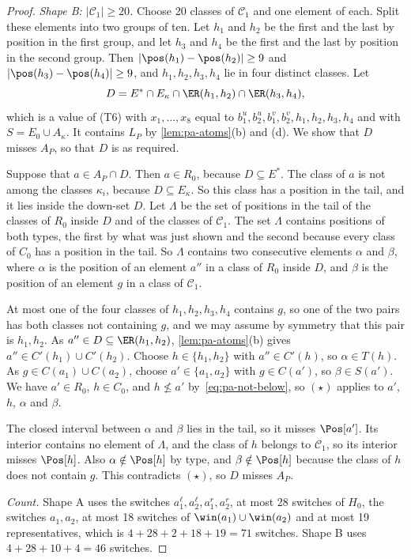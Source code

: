 \begin{proof}
\emph{Shape B: $|\mathcal{C}_1| \geq 20$.}
Choose 20 classes of $\mathcal{C}_1$ and one element of each.
Split these elements into two groups of ten.
Let $h_1$ and $h_2$ be the first and the last by position in the first group, and let $h_3$ and $h_4$ be the first and the last by position in the second group.
Then $|\pos(h_1) - \pos(h_2)| \geq 9$ and $|\pos(h_3) - \pos(h_4)| \geq 9$, and $h_1, h_2, h_3, h_4$ lie in four distinct classes.
Let
\[
D = E^* \cap E_\kappa \cap \ER(h_1, h_2) \cap \ER(h_3, h_4),
\]
which is a value of (T6) with $x_1, \dots, x_8$ equal to $b^u_1, b^u_2, b^v_1, b^v_2, h_1, h_2, h_3, h_4$ and with $S = E_0 \cup A_\kappa$.
It contains $L_P$ by \cref{lem:pa-atoms}(b) and (d).
We show that $D$ misses $A_P$, so that $D$ is as required.

Suppose that $a \in A_P \cap D$.
Then $a \in R_0$, because $D \subseteq E^*$.
The class of $a$ is not among the classes $\kappa_i$, because $D \subseteq E_\kappa$.
So this class has a position in the tail, and it lies inside the down-set $D$.
Let $\Lambda$ be the set of positions in the tail of the classes of $R_0$ inside $D$ and of the classes of $\mathcal{C}_1$.
The set $\Lambda$ contains positions of both types, the first by what was just shown and the second because every class of $C_0$ has a position in the tail.
So $\Lambda$ contains two consecutive elements $\alpha$ and $\beta$, where $\alpha$ is the position of an element $a''$ in a class of $R_0$ inside $D$, and $\beta$ is the position of an element $g$ in a class of $\mathcal{C}_1$.

At most one of the four classes of $h_1, h_2, h_3, h_4$ contains $g$, so one of the two pairs has both classes not containing $g$, and we may assume by symmetry that this pair is $h_1, h_2$.
As $a'' \in D \subseteq \ER(h_1, h_2)$, \cref{lem:pa-atoms}(b) gives $a'' \in C'(h_1) \cup C'(h_2)$.
Choose $h \in \{h_1, h_2\}$ with $a'' \in C'(h)$, so $\alpha \in T(h)$.
As $g \in C(a_1) \cup C(a_2)$, choose $a' \in \{a_1, a_2\}$ with $g \in C(a')$, so $\beta \in S(a')$.
We have $a' \in R_0$, $h \in C_0$, and $h \not\leq a'$ by~\eqref{eq:pa-not-below}, so $(\star)$ applies to $a'$, $h$, $\alpha$ and $\beta$.

The closed interval between $\alpha$ and $\beta$ lies in the tail, so it misses $\Pos[a']$.
Its interior contains no element of $\Lambda$, and the class of $h$ belongs to $\mathcal{C}_1$, so its interior misses $\Pos[h]$.
Also $\alpha \notin \Pos[h]$ by type, and $\beta \notin \Pos[h]$ because the class of $h$ does not contain $g$.
This contradicts $(\star)$, so $D$ misses $A_P$.

\emph{Count.}
Shape A uses the switches $a^\ell_1, a^\ell_2, a^r_1, a^r_2$, at most 28 switches of $H_0$, the switches $a_1, a_2$, at most 18 switches of $\win(a_1) \cup \win(a_2)$ and at most 19 representatives, which is $4 + 28 + 2 + 18 + 19 = 71$ switches.
Shape B uses $4 + 28 + 10 + 4 = 46$ switches.
\end{proof}

